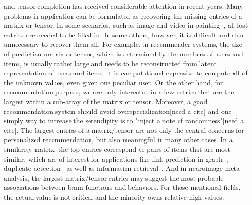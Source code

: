\documentclass[10pt,journal,compsoc]{IEEEtran}
\begin{document}
%
\IEEEpeerreviewmaketitle



 and tensor completion has received considerable attention in recent years.
Many problems in application can be formulated
as recovering the missing entries of a matrix or tensor.
In some scenarios, such as image and video in-painting~\cite{Ankita14},
all lost entries are needed to be filled in.
In some others, however, it is difficult and also unnecessary to recover them all.
For example, in recommender systems, the size of prediction matrix or tensor,
which is determined by the numbers of users and items, is usually rather large and needs to be reconstructed from latent representation of users and items.
It is computational expensive to compute all of the unknown values, even given one peculiar user.
On the other hand, for recommendation purpose,
we are only interested in a few entries that are the largest within a sub-array of the matrix or tensor.
Moreover, a good recommendation system should avoid overspecialization[need a cite] and one simply way to increase the serendipity is to "inject a note of randomness"[need a cite].
The largest entries of a matrix/tensor are not only the central concerns for personalized recommendation, but also meaningful in many other cases.
In a similarity matrix, the top entries correspond to pairs of items that are most similar,
which are of interest for applications like link prediction in graph~\cite{LibenNowell07},
duplicate detection~\cite{Ke2010} as well as information retrieval~\cite{Salton03IR}.
And in neuroimage meta-analysis,
the largest matrix/tensor entries may suggest the most probable associations between brain functions and behaviors.
For those mentioned fields, the actual value is not critical and the minority owns relative high values.
\end{document}
